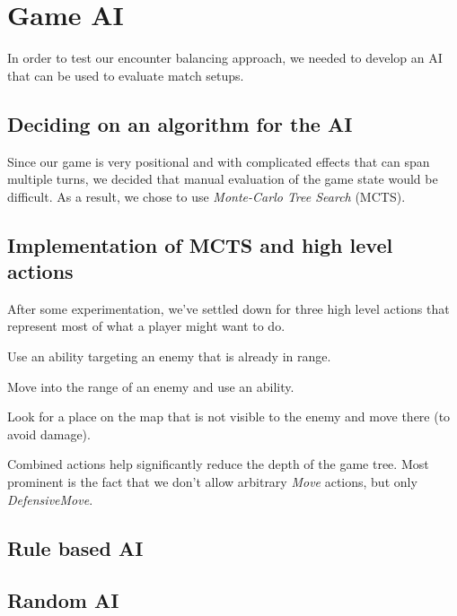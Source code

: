 \chapter{Game AI}

In order to test our encounter balancing approach, we needed to develop
an AI that can be used to evaluate match setups.

\section{Deciding on an algorithm for the AI}

Since our game is very positional and with complicated effects that can span
multiple turns, we decided that manual evaluation of the game state would be difficult.
As a result, we chose to use \emph{Monte-Carlo Tree Search} (MCTS).

\section{Implementation of MCTS and high level actions}

After some experimentation, we've settled down for three high level actions
that represent most of what a player might want to do.

\begin{description}[align=right,labelwidth=3cm]
\item [AbilityUse] Use an ability targeting an enemy that is already in range.
\item [AttackMove] Move into the range of an enemy and use an ability.
\item [DefensiveMove] Look for a place on the map that is not visible to the enemy and move there (to avoid damage).
\end{description}

Combined actions help significantly reduce the depth of the game tree. Most
prominent is the fact that we don't allow arbitrary \emph{Move} actions, but
only \emph{DefensiveMove}.

\section{Rule based AI}



\section{Random AI}

